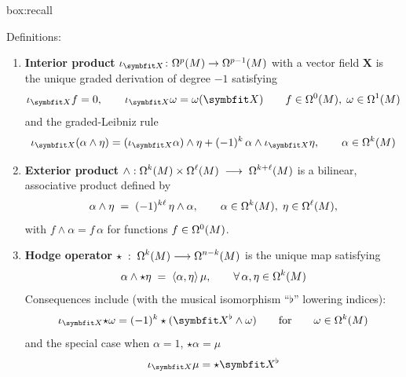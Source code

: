 \begin{ambox}{box:recall}
{\tiny 

Definitions:
\begin{enumerate}

\item \textbf{Interior product} 
$\interior{\bm{X}}{}\colon \Omega^p(\PlaneManifold) \rightarrow \Omega^{p-1}(\PlaneManifold)$ with a vector field \(\bm{X}\)  is 
the {unique graded derivation of degree \(-1\)} satisfying  
\begin{equation}
\interior{\bm{X}}{f} = 0,
\qquad
\interior{\bm{X}}{\omega} = \omega(\bm{X})
\qquad
f\in\Omega^{0}(\PlaneManifold),
\;\omega\in\Omega^{1}(\PlaneManifold)
\label{eq:def-interior-base}
\end{equation}
and the graded-Leibniz rule 
\[
\interior{\bm {X}}{(\alpha\wedge \eta)}
      = (\interior{\bm X}{\alpha})\wedge \eta
      + (-1)^{k}\,\alpha\wedge\interior{\bm X}{ \eta},
\qquad
\alpha\in\Omega^{k} (\PlaneManifold)
\]

\item \textbf{Exterior product}
$\displaystyle 
\wedge : \Omega^{k} (M)\times\Omega^{\ell} (M)\;\longrightarrow\;\Omega^{k+\ell} (M)
$
is a bilinear, associative product defined by %
\[
\alpha\wedge \eta \;=\; (-1)^{k\ell}\, \eta\wedge\alpha,
\qquad
\alpha\in\Omega^{k} (M),\; \eta\in\Omega^{\ell} (M),
\]
with \(f\wedge\alpha = f\,\alpha\) for functions \(f\in\Omega^{0} (M)\).
\item \textbf{Hodge operator} 
$\displaystyle 
\star \;:\;\Omega^{k} (M)\longrightarrow\Omega^{n-k} (M)
$
is the unique map satisfying  
\begin{equation}
\alpha\wedge\star \eta \;=\;
\langle\alpha, \eta\rangle\,\mu,
\qquad\forall\,\alpha, \eta\in\Omega^{k} (M)
\label{eq:hodge-defn}
\end{equation}
Consequences include (with the musical isomorphism  ``\(\flat\)'' lowering indices):
\[
\interior{\bm{X}}{\star \omega} = (-1)^k \star (\bm{X}^{\flat} \wedge \omega)
\qquad\text{for}\qquad \omega \in \Omega^k(\PlaneManifold)
\]
and the special case when \(\alpha=1\), \(\star \alpha = \mu\)
\begin{equation}
\interior{\bm{X}}{\mu} = \star \bm{X}^{\flat}
\label{eq:hodge-zero}
\end{equation}



\end{enumerate}}
\end{ambox}
